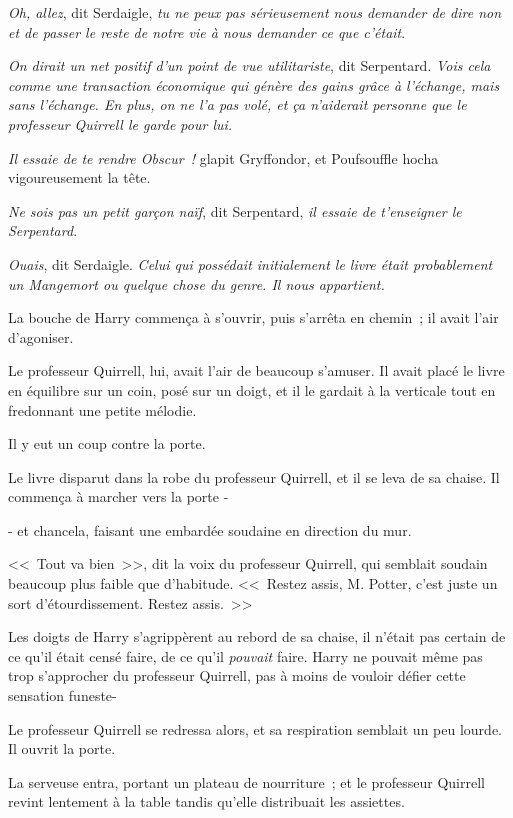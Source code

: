 \emph{Oh, allez}, dit Serdaigle, \emph{tu ne peux pas sérieusement nous demander de dire non et de passer le reste de notre vie à nous demander ce que c'était}.

\emph{On dirait un net positif d'un point de vue utilitariste}, dit Serpentard. \emph{Vois cela comme une transaction économique qui génère des gains grâce à l'échange, mais sans l'échange. En plus, on ne l'a pas volé, et ça n'aiderait personne que le professeur Quirrell le garde pour lui.}

\emph{Il essaie de te rendre Obscur~!} glapit Gryffondor, et Poufsouffle hocha vigoureusement la tête.

\emph{Ne sois pas un petit garçon naïf}, dit Serpentard, \emph{il essaie de t'enseigner le Serpentard}.

\emph{Ouais}, dit Serdaigle. \emph{Celui qui possédait initialement le livre était probablement un Mangemort ou quelque chose du genre. Il nous appartient.}

La bouche de Harry commença à s'ouvrir, puis s'arrêta en chemin~; il avait l'air d'agoniser.

Le professeur Quirrell, lui, avait l'air de beaucoup s'amuser. Il avait placé le livre en équilibre sur un coin, posé sur un doigt, et il le gardait à la verticale tout en fredonnant une petite mélodie.

Il y eut un coup contre la porte.

Le livre disparut dans la robe du professeur Quirrell, et il se leva de sa chaise. Il commença à marcher vers la porte -

- et chancela, faisant une embardée soudaine en direction du mur.

<<~Tout va bien~>>, dit la voix du professeur Quirrell, qui semblait soudain beaucoup plus faible que d'habitude. <<~Restez assis, M. Potter, c'est juste un sort d'étourdissement. Restez assis.~>>

Les doigts de Harry s'agrippèrent au rebord de sa chaise, il n'était pas certain de ce qu'il était censé faire, de ce qu'il \emph{pouvait} faire. Harry ne pouvait même pas trop s'approcher du professeur Quirrell, pas à moins de vouloir défier cette sensation funeste-

Le professeur Quirrell se redressa alors, et sa respiration semblait un peu lourde. Il ouvrit la porte.

La serveuse entra, portant un plateau de nourriture~; et le professeur Quirrell revint lentement à la table tandis qu'elle distribuait les assiettes.

